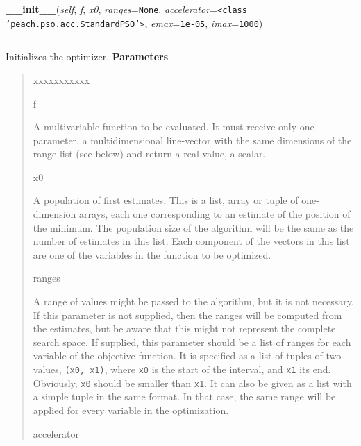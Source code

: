     \vspace{0.5ex}

\hspace{.8\funcindent}\begin{boxedminipage}{\funcwidth}

    \raggedright \textbf{\_\_init\_\_}(\textit{self}, \textit{f}, \textit{x0}, \textit{ranges}={\tt None}, \textit{accelerator}={\tt {\textless}class 'peach.pso.acc.StandardPSO'{\textgreater}}, \textit{emax}={\tt 1e-05}, \textit{imax}={\tt 1000})

    \vspace{-1.5ex}

    \rule{\textwidth}{0.5\fboxrule}
\setlength{\parskip}{2ex}

Initializes the optimizer.
\setlength{\parskip}{1ex}
      \textbf{Parameters}
      \vspace{-1ex}

      \begin{quote}
        \begin{Ventry}{xxxxxxxxxxx}

          \item[f]


A multivariable function to be evaluated. It must receive only one
parameter, a multidimensional line-vector with the same dimensions
of the range list (see below) and return a real value, a scalar.
          \item[x0]


A population of first estimates. This is a list, array or tuple of
one-dimension arrays, each one corresponding to an estimate of the
position of the minimum. The population size of the algorithm will
be the same as the number of estimates in this list. Each component
of the vectors in this list are one of the variables in the function
to be optimized.
          \item[ranges]


A range of values might be passed to the algorithm, but it is not
necessary. If this parameter is not supplied, then the ranges will
be computed from the estimates, but be aware that this might not
represent the complete search space. If supplied, this parameter
should be a list of ranges for each variable of the objective
function. It is specified as a list of tuples of two values,
\texttt{(x0, x1)}, where \texttt{x0} is the start of the interval, and \texttt{x1}
its end. Obviously, \texttt{x0} should be smaller than \texttt{x1}. It can
also be given as a list with a simple tuple in the same format. In
that case, the same range will be applied for every variable in the
optimization.
          \item[accelerator]



\end{Ventry}
\end{quote}
\end{boxedminipage}
